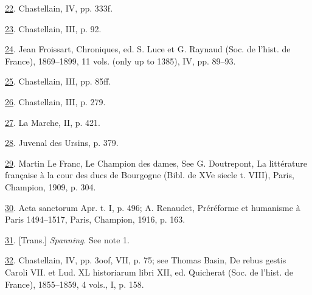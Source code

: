 \protect\hypertarget{23_NOTES.xhtmlux5cux23id_2187}{\protect\hyperlink{08_Chapter_One__THE_PASSIONATE_INTE.xhtmlux5cux23id_2186}{22}}.
Chastellain, IV, pp. 333f.

\protect\hypertarget{23_NOTES.xhtmlux5cux23page_399}{\protect\hyperlink{08_Chapter_One__THE_PASSIONATE_INTE.xhtmlux5cux23id_2185}{23}}.
Chastellain, III, p. 92.

\protect\hypertarget{23_NOTES.xhtmlux5cux23id_2184}{\protect\hyperlink{08_Chapter_One__THE_PASSIONATE_INTE.xhtmlux5cux23id_2183}{24}}.
Jean Froissart, Chroniques, ed. S. Luce et G. Raynaud (Soc. de l'hist.
de France), 1869--1899, 11 vols. (only up to 1385), IV, pp. 89--93.

\protect\hypertarget{23_NOTES.xhtmlux5cux23id_2182}{\protect\hyperlink{08_Chapter_One__THE_PASSIONATE_INTE.xhtmlux5cux23id_2181}{25}}.
Chastellain, III, pp. 85ff.

\protect\hypertarget{23_NOTES.xhtmlux5cux23id_2180}{\protect\hyperlink{08_Chapter_One__THE_PASSIONATE_INTE.xhtmlux5cux23id_2179}{26}}.
Chastellain, III, p. 279.

\protect\hypertarget{23_NOTES.xhtmlux5cux23id_2178}{\protect\hyperlink{08_Chapter_One__THE_PASSIONATE_INTE.xhtmlux5cux23id_2177}{27}}.
La Marche, II, p. 421.

\protect\hypertarget{23_NOTES.xhtmlux5cux23id_2176}{\protect\hyperlink{08_Chapter_One__THE_PASSIONATE_INTE.xhtmlux5cux23id_2175}{28}}.
Juvenal des Ursins, p. 379.

\protect\hypertarget{23_NOTES.xhtmlux5cux23id_2174}{\protect\hyperlink{08_Chapter_One__THE_PASSIONATE_INTE.xhtmlux5cux23id_2173}{29}}.
Martin Le Franc, Le Champion des dames, See G. Doutrepont, La
littérature française à la cour des ducs de Bourgogne (Bibl. de XVe
siecle t. VIII), Paris, Champion, 1909, p. 304.

\protect\hypertarget{23_NOTES.xhtmlux5cux23id_2172}{\protect\hyperlink{08_Chapter_One__THE_PASSIONATE_INTE.xhtmlux5cux23id_2171}{30}}.
Acta sanctorum Apr. t. I, p. 496; A. Renaudet, Préréforme et humanisme à
Paris 1494--1517, Paris, Champion, 1916, p. 163.

\protect\hypertarget{23_NOTES.xhtmlux5cux23id_2170}{\protect\hyperlink{08_Chapter_One__THE_PASSIONATE_INTE.xhtmlux5cux23id_2169}{31}}.
{[}Trans.{]} \emph{Spanning}. See note 1.

\protect\hypertarget{23_NOTES.xhtmlux5cux23id_2168}{\protect\hyperlink{08_Chapter_One__THE_PASSIONATE_INTE.xhtmlux5cux23id_2167}{32}}.
Chastellain, IV, pp. 3oof, VII, p. 75; see Thomas Basin, De rebus gestis
Caroli VII. et Lud. XL historiarum libri XII, ed. Quicherat (Soc. de
l'hist. de France), 1855--1859, 4 vols., I, p. 158.

